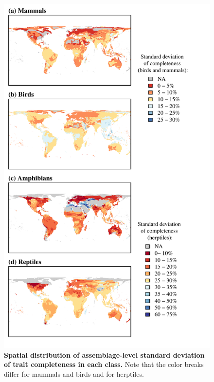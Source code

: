 \newpage
\begin{figure}[h!]
\vspace*{-2cm}
\centering
\includegraphics[scale=0.95]{Supporting/Chapter2/Figures/Maps/sd_map}
\caption[Spatial distribution of  assemblage-level standard deviation of trait completeness in each class.]{\textbf{Spatial distribution of  assemblage-level standard deviation of trait completeness in each class.} Note that the color breaks differ for mammals and birds and for herptiles.}
\label{SI2_sdcomp_spatial}
\end{figure}


